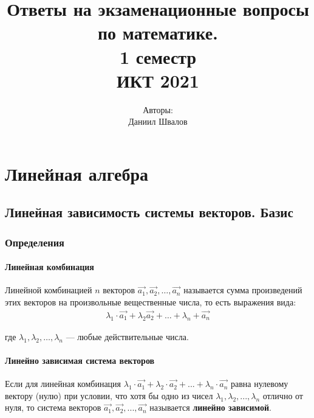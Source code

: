 \documentclass[a4paper,12pt]{extbook}
\title{
    Ответы на экзаменационные вопросы по математике. \\
    \vspace{2cm} 1 семестр \\
    \vspace{2cm} ИКТ 2021
    \vfill
}
\author{
    Авторы: \\
    Даниил Швалов
}
\date{}
\theoremstyle{named}
\theoremstyle{named}
\begin{document}
\begin{titlepage}
    \maketitle
    \thispagestyle{empty}
\end{titlepage}
\setcounter{tocdepth}{5}

\setcounter{page}{2}
{
    \hypersetup{linkcolor=black}
    \tableofcontents
}



\chapter{Линейная алгебра}

\section{Линейная зависимость системы векторов. Базис}\label{sec:linear-dependence}

\subsection*{Определения}

\subsubsection*{Линейная комбинация}
Линейной комбинацией \(n\) векторов \(\overrightarrow{a_1}, \overrightarrow{a_2}, \ldots, \overrightarrow{a_n}\) называется сумма произведений этих векторов на произвольные вещественные числа, то есть выражения вида:
\begin{gather*}
    \lambda_1 \cdot \overrightarrow{a_1} + \lambda_2 \overrightarrow{a_2} + \ldots + \lambda_n + \overrightarrow{a_n}
\end{gather*}

где \(\lambda_1, \lambda_2, \ldots, \lambda_n\) — любые действительные числа.

\subsubsection*{Линейно зависимая система векторов}
Если для линейная комбинация \(\lambda_1 \cdot \overrightarrow{a_1} + \lambda_2 \cdot \overrightarrow{a_2} + ... + \lambda_n \cdot \overrightarrow{a_n}\) равна нулевому вектору (нулю) при условии, что хотя бы одно из чисел \(\lambda_1, \lambda_2, ..., \lambda_n\) отлично от нуля, то система векторов \(\overrightarrow{a_1}, \overrightarrow{a_2}, ..., \overrightarrow{a_n}\) называется \textbf{линейно зависимой}.
\end{document}
